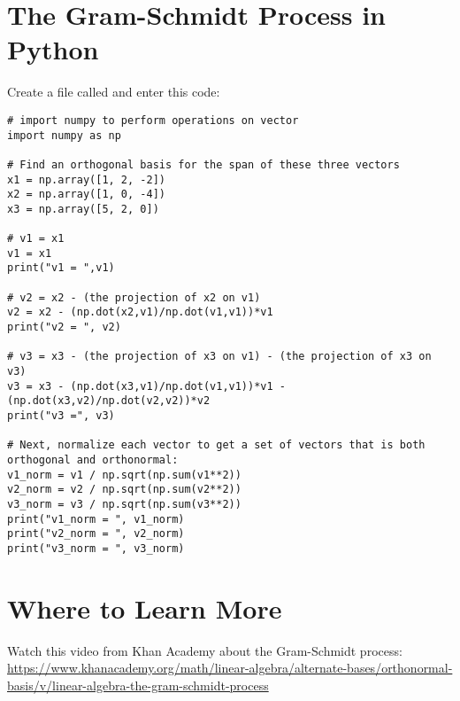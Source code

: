 \section{The Gram-Schmidt Process in Python}
Create a file called  and enter this code:
\begin{Verbatim}
# import numpy to perform operations on vector
import numpy as np

# Find an orthogonal basis for the span of these three vectors  
x1 = np.array([1, 2, -2]) 
x2 = np.array([1, 0, -4]) 
x3 = np.array([5, 2, 0])    
   
# v1 = x1
v1 = x1
print("v1 = ",v1)

# v2 = x2 - (the projection of x2 on v1)
v2 = x2 - (np.dot(x2,v1)/np.dot(v1,v1))*v1
print("v2 = ", v2)

# v3 = x3 - (the projection of x3 on v1) - (the projection of x3 on v3)
v3 = x3 - (np.dot(x3,v1)/np.dot(v1,v1))*v1 - (np.dot(x3,v2)/np.dot(v2,v2))*v2
print("v3 =", v3)

# Next, normalize each vector to get a set of vectors that is both orthogonal and orthonormal:
v1_norm = v1 / np.sqrt(np.sum(v1**2))
v2_norm = v2 / np.sqrt(np.sum(v2**2))
v3_norm = v3 / np.sqrt(np.sum(v3**2))
print("v1_norm = ", v1_norm)
print("v2_norm = ", v2_norm)
print("v3_norm = ", v3_norm)
\end{Verbatim}

\section{Where to Learn More}
Watch this video from Khan Academy about the Gram-Schmidt process: \url{https://www.khanacademy.org/math/linear-algebra/alternate-bases/orthonormal-basis/v/linear-algebra-the-gram-schmidt-process}
